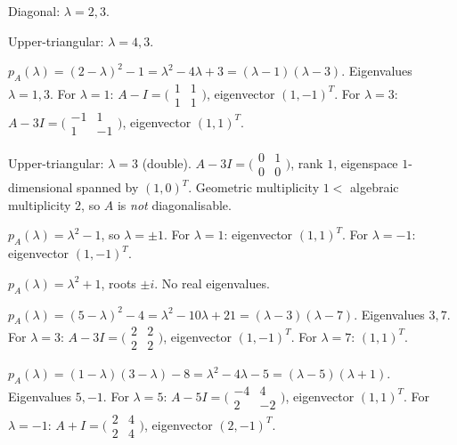 \begin{solutions}
  \item Diagonal: $\lambda = 2, 3$.
  \item Upper-triangular: $\lambda = 4, 3$.
  \item $p_{A}(\lambda) = (2 - \lambda)^{2} - 1 = \lambda^{2} - 4 \lambda + 3 = (\lambda - 1)(\lambda - 3)$. Eigenvalues $\lambda = 1, 3$.
  For $\lambda = 1$: $A - I = \bigl(\begin{smallmatrix} 1 & 1 \\ 1 & 1 \end{smallmatrix}\bigr)$, eigenvector $(1, -1)^{T}$.
  For $\lambda = 3$: $A - 3 I = \bigl(\begin{smallmatrix} -1 & 1 \\ 1 & -1 \end{smallmatrix}\bigr)$, eigenvector $(1, 1)^{T}$.
  \item Upper-triangular: $\lambda = 3$ (double). $A - 3 I = \bigl(\begin{smallmatrix} 0 & 1 \\ 0 & 0 \end{smallmatrix}\bigr)$, rank $1$, eigenspace $1$-dimensional spanned by $(1, 0)^{T}$. Geometric multiplicity $1 <$ algebraic multiplicity $2$, so $A$ is \emph{not} diagonalisable.
  \item $p_{A}(\lambda) = \lambda^{2} - 1$, so $\lambda = \pm 1$. For $\lambda = 1$: eigenvector $(1, 1)^{T}$. For $\lambda = -1$: eigenvector $(1, -1)^{T}$.
  \item $p_{A}(\lambda) = \lambda^{2} + 1$, roots $\pm i$. No real eigenvalues.
  \item $p_{A}(\lambda) = (5 - \lambda)^{2} - 4 = \lambda^{2} - 10 \lambda + 21 = (\lambda - 3)(\lambda - 7)$. Eigenvalues $3, 7$. For $\lambda = 3$: $A - 3 I = \bigl(\begin{smallmatrix} 2 & 2 \\ 2 & 2 \end{smallmatrix}\bigr)$, eigenvector $(1, -1)^{T}$. For $\lambda = 7$: $(1, 1)^{T}$.
  \item $p_{A}(\lambda) = (1 - \lambda)(3 - \lambda) - 8 = \lambda^{2} - 4 \lambda - 5 = (\lambda - 5)(\lambda + 1)$. Eigenvalues $5, -1$.
  For $\lambda = 5$: $A - 5 I = \bigl(\begin{smallmatrix} -4 & 4 \\ 2 & -2 \end{smallmatrix}\bigr)$, eigenvector $(1, 1)^{T}$.
  For $\lambda = -1$: $A + I = \bigl(\begin{smallmatrix} 2 & 4 \\ 2 & 4 \end{smallmatrix}\bigr)$, eigenvector $(2, -1)^{T}$.

\end{solutions}

